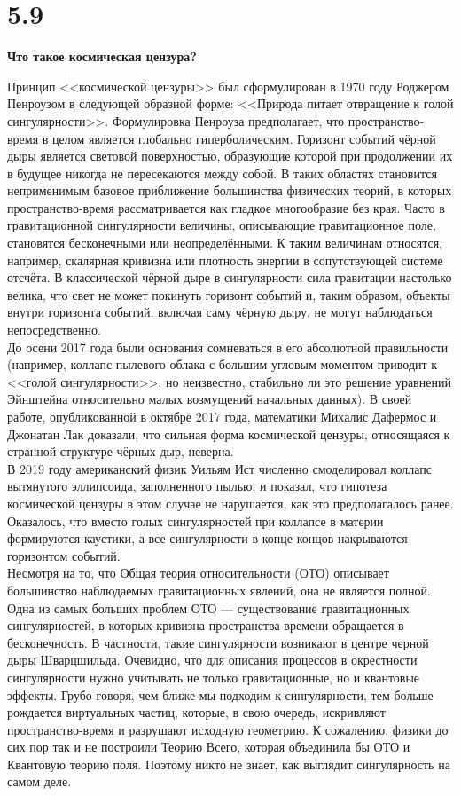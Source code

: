 \documentclass[a4paper,14pt]{article}
\begin{document}
\section*{5.9}

\begin{center}
	\LARGE{\textbf{Что такое космическая цензура?}}\\
\end{center}

Принцип <<космической цензуры>> был сформулирован в 1970 году Роджером Пенроузом в следующей образной форме: <<Природа питает отвращение к голой сингулярности>>. Формулировка Пенроуза предполагает, что пространство-время в целом является глобально гиперболическим. Горизонт событий чёрной дыры является световой поверхностью, образующие которой при продолжении их в будущее никогда не пересекаются между собой. В таких областях становится неприменимым базовое приближение большинства физических теорий, в которых пространство-время рассматривается как гладкое многообразие без края. Часто в гравитационной сингулярности величины, описывающие гравитационное поле, становятся бесконечными или неопределёнными. К таким величинам относятся, например, скалярная кривизна или плотность энергии в сопутствующей системе отсчёта. В классической чёрной дыре в сингулярности сила гравитации настолько велика, что свет не может покинуть горизонт событий и, таким образом, объекты внутри горизонта событий, включая саму чёрную дыру, не могут наблюдаться непосредственно.
\\ До осени 2017 года были основания сомневаться в его абсолютной правильности (например, коллапс пылевого облака с большим угловым моментом приводит к <<голой сингулярности>>, но неизвестно, стабильно ли это решение уравнений Эйнштейна относительно малых возмущений начальных данных). В своей работе, опубликованной в октябре 2017 года, математики Михалис Дафермос и Джонатан Лак доказали, что сильная форма космической цензуры, относящаяся к странной структуре чёрных дыр, неверна.
\\ В 2019 году американский физик Уильям Ист численно смоделировал коллапс вытянутого эллипсоида, заполненного пылью, и показал, что гипотеза космической цензуры в этом случае не нарушается, как это предполагалось ранее. Оказалось, что вместо голых сингулярностей при коллапсе в материи формируются каустики, а все сингулярности в конце концов накрываются горизонтом событий.
\\ Несмотря на то, что Общая теория относительности (ОТО) описывает большинство наблюдаемых гравитационных явлений, она не является полной. Одна из самых больших проблем ОТО — существование гравитационных сингулярностей, в которых кривизна пространства-времени обращается в бесконечность. В частности, такие сингулярности возникают в центре черной дыры Шварцшильда. Очевидно, что для описания процессов в окрестности сингулярности нужно учитывать не только гравитационные, но и квантовые эффекты. Грубо говоря, чем ближе мы подходим к сингулярности, тем больше рождается виртуальных частиц, которые, в свою очередь, искривляют пространство-время и разрушают исходную геометрию. К сожалению, физики до сих пор так и не построили Теорию Всего, которая объединила бы ОТО и Квантовую теорию поля. Поэтому никто не знает, как выглядит сингулярность на самом деле.
\end{document}
